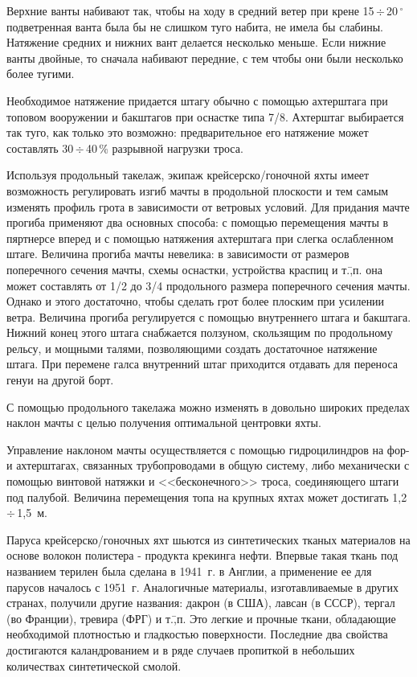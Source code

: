 \documentclass[a4paper, 12pt, twoside, final, book, russian, fittopage, cyremdash]{ncc}
\newcommand{\gr}{\ensuremath{\,^\circ}\xspace}
\newcommand{\otdo}{\,\ensuremath{\div}\,}
\begin{document}
Верхние ванты набивают так, чтобы на ходу в средний ветер при крене 15\otdo 20\gr подветренная ванта была бы не слишком туго набита, не имела бы слабины. Натяжение средних и нижних вант делается несколько меньше. Если нижние ванты двойные, то сначала набивают передние, с тем чтобы они были несколько более тугими. 

Необходимое натяжение придается штагу обычно с помощью ахтерштага при топовом вооружении и бакштагов при оснастке типа 7/8. Ахтерштаг выбирается так туго, как только это возможно: предварительное его натяжение может составлять 30\otdo 40\,\% разрывной нагрузки троса. 

Используя продольный такелаж, экипаж крейсерско\-/гоночной яхты имеет возможность регулировать изгиб мачты в продольной плоскости и тем самым изменять профиль грота в зависимости от ветровых условий. Для придания мачте прогиба применяют два основных способа: с помощью перемещения мачты в пяртнерсе вперед и с помощью натяжения ахтерштага при слегка ослабленном штаге. Величина прогиба мачты невелика: в зависимости от размеров поперечного сечения мачты, схемы оснастки, устройства краспиц и т.\=,п. она может составлять от 1/2 до 3/4 продольного размера поперечного сечения мачты. Однако и этого достаточно, чтобы сделать грот более плоским при усилении ветра. Величина прогиба регулируется с помощью внутреннего штага и бакштага. Нижний конец этого штага снабжается ползуном, скользящим по продольному рельсу, и мощными талями, позволяющими создать достаточное натяжение штага. При перемене галса внутренний штаг приходится отдавать для переноса генуи на другой борт. 

С помощью продольного такелажа можно изменять в довольно широких пределах наклон мачты с целью получения оптимальной центровки яхты. 

Управление наклоном мачты осуществляется с помощью гидроцилиндров на фор- и ахтерштагах, связанных трубопроводами в общую систему, либо механически с помощью винтовой натяжки и <<бесконечного>> троса, соединяющего штаги под палубой. Величина перемещения топа на крупных яхтах может достигать 1,2\otdo 1,5~м. 

Паруса крейсерско\-/гоночных яхт шьются из синтетических тканых материалов на основе волокон полистера \-- продукта крекинга нефти. Впервые такая ткань под названием терилен была сделана в 1941~г. в Англии, а применение ее для парусов началось с 1951~г. Аналогичные материалы, изготавливаемые в других странах, получили другие названия: дакрон (в США), лавсан (в СССР), тергал (во Франции), тревира (ФРГ) и т.\=,п. Это легкие и прочные ткани, обладающие необходимой плотностью и гладкостью поверхности. Последние два свойства достигаются каландрованием и в ряде случаев пропиткой в небольших количествах синтетической смолой. 
\end{document}
